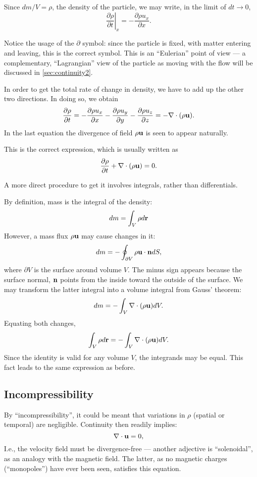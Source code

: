 Since $dm/V=\rho$, the density of the particle, we may write, in the
limit of $dt\to 0$,
\[
\left. \frac{\partial \rho}{\partial t} \right|_x =
-\frac{\partial  \rho  u_x}{\partial x} .
\]

Notice the usage of the $\partial$ symbol: since the particle is
fixed, with matter entering and leaving, this is the correct
symbol. This is an ``Eulerian'' point of view --- a complementary,
``Lagrangian'' view of the particle as moving with the flow will be
discussed in \ref{sec:continuity2}.

In order to get the total rate of change in density, we have to
add up the other two directions. In doing so, we obtain
\begin{equation}
  \label{eq:continuity0}
  \frac{\partial \rho}{\partial t} =
  -\frac{\partial  \rho  u_x}{\partial x}
    -\frac{\partial  \rho  u_y}{\partial y}
    -\frac{\partial  \rho  u_z}{\partial z}  =
    -\nabla\cdot ( \rho  \mathbf{u}) .
\end{equation}
In the last equation the divergence of field $ \rho \mathbf{u}$ is
seen to appear naturally.

This is the correct expression, which is usually written as
\begin{equation}
  \label{eq:continuity}
  \frac{\partial \rho }{\partial t} +  \nabla \cdot (\rho \mathbf{u} ) = 0 .
\end{equation}


A more direct procedure to get it involves integrals, rather
than differentials.

By definition, mass is the integral of the density:
\[
d m = \int_V \rho d\mathbf{r}
\]
However, a mass flux $\rho\mathbf{u}$ may cause changes in it:
\[
d m = - \oint_{\partial V} \rho \mathbf{u} \cdot \mathbf{n} dS ,
\]
where $\partial V$ is the surface around volume $V$. The minus sign
appears because the surface normal, $\mathbf{n}$ points from the inside
toward the outside of the surface. We may transform the latter
integral into a volume integral from Gauss' theorem:
\[
d m = - \int_V \nabla\cdot (\rho \mathbf{u} ) dV .
\]
Equating both changes,
\[
\int_V \rho d\mathbf{r} = - \int_V \nabla\cdot (\rho \mathbf{u} ) dV .
\]
Since the identity is valid for any volume $V$, the integrands may
be equal. This fact leads to the same expression as before.


\subsection{Incompressibility}
By ``incompressibility'', it could be meant that variations in $\rho$
(spatial or temporal) are negligible. Continuity then readily implies:
\[
\nabla \cdot  \mathbf{u}  = 0 ,
\]
I.e., the velocity field must be divergence-free --- another adjective
is ``solenoidal'', as an analogy with the magnetic field. The latter,
as no magnetic charges (``monopoles'') have ever been seen, satisfies
this equation.

